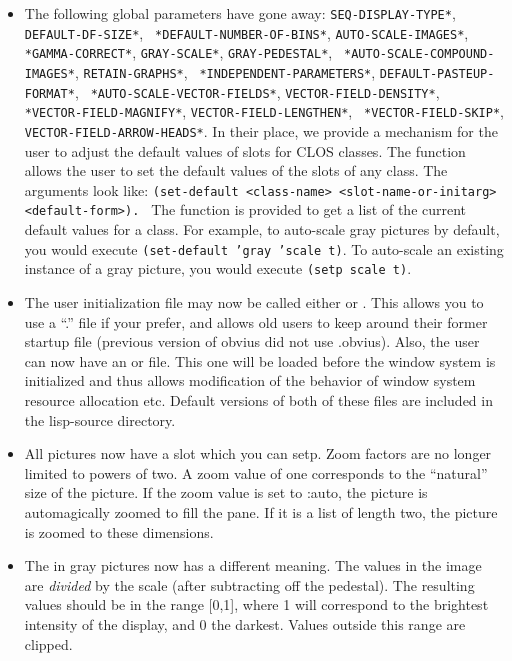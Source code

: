 \begin{itemize}

\item The following global parameters have gone away: 
{\tt *SEQ-DISPLAY-TYPE*}, {\tt *DEFAULT-DF-SIZE*}, {\tt
*DEFAULT-NUMBER-OF-BINS*}, {\tt *AUTO-SCALE-IMAGES*}, {\tt
*GAMMA-CORRECT*}, {\tt *GRAY-SCALE*}, {\tt *GRAY-PEDESTAL*}, {\tt
*AUTO-SCALE-COMPOUND-IMAGES*}, {\tt *RETAIN-GRAPHS*}, {\tt
*INDEPENDENT-PARAMETERS*}, {\tt *DEFAULT-PASTEUP-FORMAT*}, {\tt
*AUTO-SCALE-VECTOR-FIELDS*}, {\tt *VECTOR-FIELD-DENSITY*}, {\tt
*VECTOR-FIELD-MAGNIFY*}, {\tt *VECTOR-FIELD-LENGTHEN*}, {\tt
*VECTOR-FIELD-SKIP*}, {\tt *VECTOR-FIELD-ARROW-HEADS*}.  In their
place, we provide a mechanism for the user to adjust the default
values of slots for CLOS classes. The function 
allows the user to set the default values of the slots of any class.
The arguments look like: {\tt (set-default <class-name>
<slot-name-or-initarg> <default-form>). } The function
 is provided to get a list of the current default
values for a class.  For example, to auto-scale gray pictures by
default, you would execute {\tt (set-default 'gray 'scale t)}.  To
auto-scale an existing instance of a gray picture, you would execute 
{\tt (setp scale t)}.

\item The user initialization file may now be called either
 or .  This allows you to use a ``.'' file if
your prefer, and allows old users to keep around their former startup
file (previous version of obvius did not use .obvius).  Also, the user
can now have an  or
 file.  This one will be loaded before the
window system is initialized and thus allows modification of the
behavior of window system resource allocation etc.  Default versions
of both of these files are included in the lisp-source directory.

\item All pictures now have a  slot which you can setp.
Zoom factors are no longer limited to powers of two.  A zoom value of
one corresponds to the ``natural'' size of the picture.  If the zoom
value is set to :auto, the picture is automagically zoomed to fill the
pane.  If it is a list of length two, the picture is zoomed to these
dimensions.

\item The  in gray pictures now has a different meaning.  The
values in the image are {\em divided} by the scale (after subtracting off
the pedestal).  The resulting values should be in the range [0,1],
where 1 will correspond to the brightest intensity of the display, and
0 the darkest.  Values outside this range are clipped.


\end{itemize}
